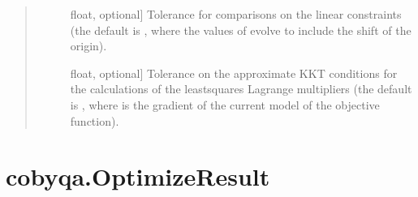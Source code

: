 \documentclass[letterpaper,10pt,english]{sphinxmanual}
\begin{document}
\begin{fulllineitems}
\begin{quote}
\begin{description}
\begin{description}
\item[{}] \leavevmode{[}float, optional{]}
\sphinxAtStartPar
Tolerance for comparisons on the linear constraints (the default is
, where the values of 
evolve to include the shift of the origin).

\item[{}] \leavevmode{[}float, optional{]}
\sphinxAtStartPar
Tolerance on the approximate KKT conditions for the calculations of the
least\sphinxhyphen{}squares Lagrange multipliers (the default is
, where  is the
gradient of the current model of the objective function).

\end{description}

\end{description}\end{quote}

\end{fulllineitems}



\section{cobyqa.OptimizeResult}
\label{\detokenize{refs/generated/cobyqa.OptimizeResult:cobyqa-optimizeresult}}\label{\detokenize{refs/generated/cobyqa.OptimizeResult::doc}}
\end{document}
